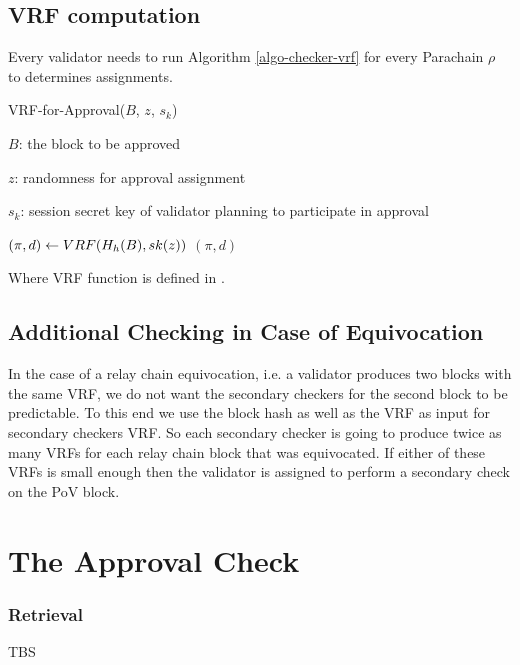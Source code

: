 \subsection{VRF computation}

Every validator needs to run Algorithm \ref{algo-checker-vrf} for every Parachain $\rho$ to determines assignments.  

\begin{algorithm}
  \caption[VRF-for-Approval]{\sc VRF-for-Approval($B$, $z$, $s_k$)}
  \label{algo-checker-vrf}
  \begin{algorithmic}[1]
  \Require

    $B$: the block to be approved 

    $z$: randomness for approval assignment

    $s_k$: session secret key of validator planning to participate in approval

    \State $(\pi, d) \leftarrow {\sc VRF}(H_h(B),sk(z))$
    \State \Return $(\pi,d)$
  \end{algorithmic}
\end{algorithm}

Where {\sc VRF} function is defined in \cite{polkadot-crypto-spec}.

\subsection{Additional Checking in Case of Equivocation}\label{sect-equivocation-case}
In the case of a relay chain equivocation, i.e. a validator produces two blocks with the same VRF, we do not want the secondary checkers for the second block to be predictable. To this end we use the block hash as well as the VRF as input for secondary checkers VRF. So each secondary checker is going to produce twice as many VRFs for each relay chain block that was equivocated. If either of these VRFs is small enough then the validator is assigned to perform a secondary check on the PoV block.

\section{The Approval Check}
\label{sect-approval-checking}
\subsubsection{Retrieval}
\label{sect-retrieval-of-erasure-pieces}
TBS

